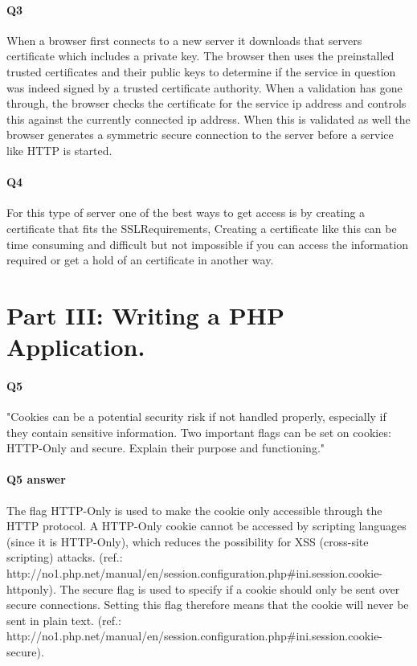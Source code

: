\documentclass[11pt, a4paper]{article}
\begin{document}
\paragraph{Q3}
When a browser first connects to a new server it downloads that servers certificate which includes a private key. The browser then uses the preinstalled trusted certificates and their public keys to determine if the service in question was indeed signed by a trusted certificate authority. When a validation has gone through, the browser checks the certificate for the service ip address and controls this against the currently connected ip address. When this is validated as well the browser generates a symmetric secure connection to the server before a service like HTTP is started. 
\paragraph{Q4}
For this type of server one of the best ways to get access is by creating a certificate that fits the SSLRequirements, Creating a certificate like this can be time consuming and difficult but not impossible if you can access the information required or get a hold of an certificate in another way.
\section{Part III: Writing a PHP Application.}
\paragraph{Q5}
"Cookies can be a potential security risk if not handled properly, especially if they contain
sensitive information. Two important flags can be set on cookies: HTTP-Only and secure.
Explain their purpose and functioning."
\paragraph{Q5 answer}
The flag HTTP-Only is used to make the cookie only accessible through the HTTP protocol. A HTTP-Only cookie cannot be accessed by scripting languages (since it is HTTP-Only), which reduces the possibility for XSS (cross-site scripting) attacks. (ref.: http://no1.php.net/manual/en/session.configuration.php\#ini.session.cookie-httponly).
The secure flag is used to specify if a cookie should only be sent over secure connections. Setting this flag therefore means that the cookie will never be sent in plain text. (ref.: http://no1.php.net/manual/en/session.configuration.php\#ini.session.cookie-secure).
\end{document}
